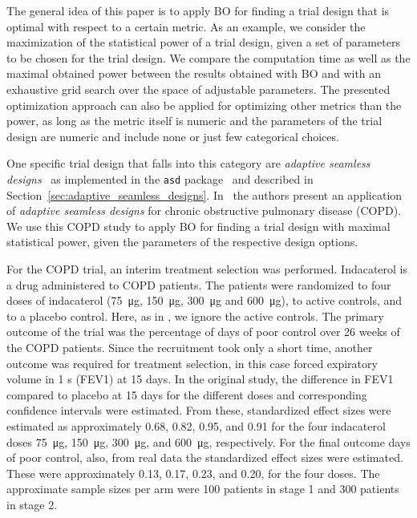 \documentclass[bimj,fleqn]{w-art}
\theoremstyle{plain}
\theoremstyle{definition}
\begin{document}
The general idea of this paper is to apply BO for finding a trial design that is optimal with respect to a certain metric.
As an example, we consider the maximization of the statistical power of a trial design, given a set of parameters to be chosen for the trial design.
We compare the computation time as well as the maximal obtained power between the results obtained with BO and with an exhaustive grid search over the space of adjustable parameters.
The presented optimization approach can also be applied for optimizing other metrics than the power, as long as the metric itself is numeric and the parameters of the trial design are numeric and include none or just few categorical choices.

One specific trial design that falls into this category are \emph{adaptive seamless designs}~\citep{barnes_integrating_2010} as implemented in the \texttt{asd} package~\citep{parsons_software_2011} and described in Section~\ref{sec:adaptive_seamless_designs}.
In~\citet{friede_adaptive_2020} the authors present an application of \emph{adaptive seamless designs} for chronic obstructive pulmonary disease (COPD).
We use this COPD study to apply BO for finding a trial design with maximal statistical power, given the parameters of the respective design options.


For the COPD trial, an interim treatment selection was performed. 
Indacaterol is a drug administered to COPD patients.
The patients were randomized to four doses of indacaterol (\SI{75}{\micro\gram}, \SI{150}{\micro\gram}, \SI{300}{\micro\gram} and \SI{600}{\micro\gram}), to active controls, and to a placebo control.
Here, as in \citet{friede_adaptive_2020}, we ignore the active controls.
The primary outcome of the trial was the percentage of days of poor control over 26 weeks of the COPD patients.
Since the recruitment took only a short time, another outcome was required for treatment selection, in this case forced expiratory volume in 1 s (FEV1) at 15 days.
In the original study, the difference in FEV1 compared to placebo at 15 days for the different doses and corresponding confidence intervals were estimated.
From these, standardized effect sizes were estimated as approximately 0.68, 0.82, 0.95, and 0.91 for the four indacaterol doses \SI{75}{\micro\gram}, \SI{150}{\micro\gram}, \SI{300}{\micro\gram}, and \SI{600}{\micro\gram}, respectively.
For the final outcome days of poor control, also, from real data the standardized effect sizes were estimated.
These were approximately 0.13, 0.17, 0.23, and 0.20, for the four doses.
The approximate sample sizes per arm were 100 patients in stage 1 and 300 patients in stage 2.
\end{document}
